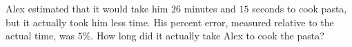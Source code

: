Alex estimated that it would take him $26$ minutes and $15$ seconds to cook pasta, but it actually took him less time. His percent error, measured relative to the actual time, was $5\%$. How long did it actually take Alex to cook the pasta?
